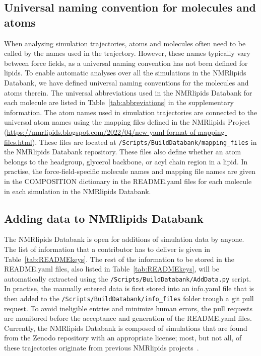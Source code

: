 \documentclass[fleqn,10pt]{wlscirep}
\begin{document}
\subsection{Universal naming convention for molecules and atoms} \label{naming}
When analysing simulation trajectories, atoms and molecules often need to be  called by the names used in the trajectory. However, these names typically vary between force fields, as a universal naming convention has not been defined for lipids. To enable automatic analyses over all the simulations in the NMRlipids Databank, we have defined universal naming conventions for the molecules and atoms therein. The universal abbreviations used in the NMRlipids Databank for each molecule are listed in Table~\ref{tab:abbreviations} in the supplementary information. The atom names used in simulation trajectories are connected to the universal atom names using the mapping files defined in the NMRlipids Project (\url{https://nmrlipids.blogspot.com/2022/04/new-yaml-format-of-mapping-files.html}). These files are located at \texttt{/Scripts/BuildDatabank/mapping\_files} in the NMRlipids Databank repository. These files also define whether an atom belongs to the headgroup, glycerol backbone, or acyl chain region in a lipid. In practise, the force-field-specific molecule names and mapping file
names are given in the COMPOSITION dictionary in the README.yaml files for each molecule in each simulation in the NMRlipids Databank.

\subsection{Adding data to NMRlipids Databank}
The NMRlipids Databank is open for additions of simulation data by anyone. The list of information that a contributor has to deliver is given in Table~\ref{tab:READMEkeys}. The rest of the information to be stored in the README.yaml files, also listed in Table~\ref{tab:READMEkeys}, will be automatically extracted using the \texttt{/Scripts/BuildDatabank/AddData.py} script. In practise, the manually entered data is first stored into an info.yaml file that is then added to the \texttt{/Scripts/BuildDatabank/info\_files} folder trough a git pull request. To avoid ineligible entries and minimize human errors, the pull requests are monitored before the acceptance and generation of the README.yaml files.  Currently, the NMRlipids Databank is composed of simulations that are found from the Zenodo repository with an appropriate license; most, but not all, of these trajectories originate from previous NMRlipids projects~\cite{botan15,catte16,antila19,bacle21}.
\end{document}
